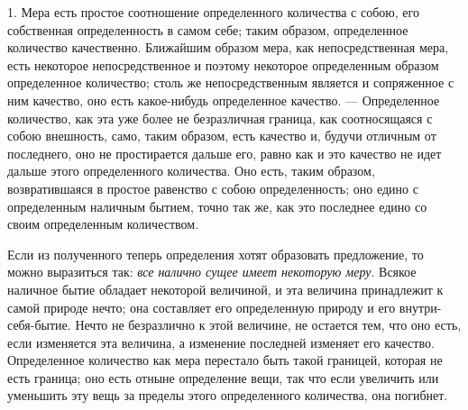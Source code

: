 1. Мера есть простое соотношение определенного
количества с собою, его собственная определенность в самом себе; таким
образом, определенное количество качественно. Ближайшим образом мера, как
непосредственная мера, есть некоторое непосредственное и поэтому некоторое
определенным образом определенное количество; столь же непосредственным
является и сопряженное с ним качество, оно есть какое-нибудь определенное
качество. — Определенное количество, как эта уже более не безразличная
граница, как соотносящаяся с собою внешность, само, таким образом, есть
качество и, будучи отличным от последнего, оно не простирается дальше его,
равно как и это качество не идет дальше этого определенного количества. Оно
есть, таким образом, возвратившаяся в простое равенство с собою
определенность; оно едино с определенным наличным бытием, точно так же, как
это последнее едино со своим определенным количеством.

Если из полученного теперь определения хотят образовать предложение, то
можно выразиться так: {\em все налично сущее имеет
некоторую меру}. Всякое наличное бытие обладает некоторой величиной, и эта
величина принадлежит к самой природе нечто; она составляет его определенную
природу и его внутри-себя-бытие. Нечто не безразлично к этой величине, не
остается тем, что оно есть, если изменяется эта величина, а изменение
последней изменяет его качество. Определенное количество как мера перестало
быть такой границей, которая не есть граница; оно есть отныне определение
вещи, так что если увеличить или уменьшить эту вещь за пределы этого
определенного количества, она погибнет.

